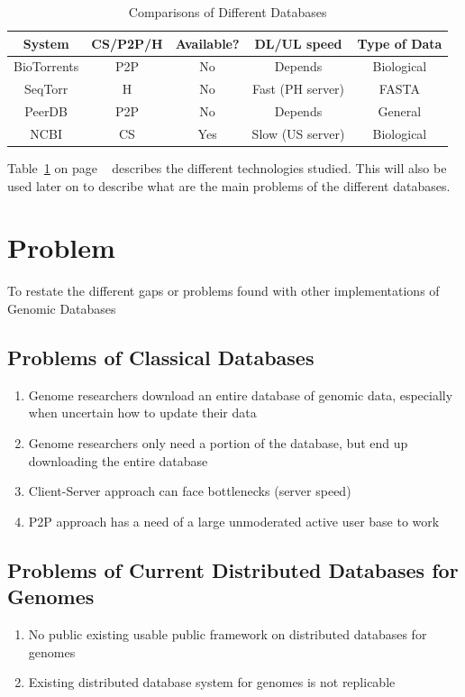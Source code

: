 \documentclass[acmsmall]{acmart}
\begin{document}
\begin{table}[h]
    \caption{Comparisons of Different Databases}
    \label{table:database_comparison_table}
    \begin{tabular}{ccccc}
    \toprule
    System      & CS/P2P/H & Available? & DL/UL speed & Type of Data \\ 
    \midrule
    BioTorrents & P2P           & No         & Depends                    & Biological  \\ 
    SeqTorr     & H             & No         & Fast (PH server)           & FASTA        \\ 
    PeerDB      & P2P           & No         & Depends                    & General      \\ 
    NCBI        & CS            & Yes        & Slow (US server)           & Biological  \\ 
    \bottomrule
    \end{tabular}
\end{table} 

Table~\ref{table:database_comparison_table} on page ~\pageref{table:database_comparison_table} describes the different technologies studied. This will also be used later on to describe what are the main problems of the different databases.

\section{Problem}
To restate the different gaps or problems found with other implementations of Genomic Databases
\subsection{Problems of Classical Databases}
\begin{enumerate}
\item Genome researchers download an entire database of genomic data, especially when uncertain how to update their data
\item Genome researchers only need a portion of the database, but end up downloading the entire database
\item Client-Server approach can face bottlenecks (server speed)
\item P2P approach has a need of a large unmoderated active user base to work

\end{enumerate}

\subsection{Problems of Current Distributed Databases for Genomes}
\begin{enumerate}
    \item No public existing usable public framework on distributed databases for genomes
    \item Existing distributed database system for genomes is not replicable
\end{enumerate}
\end{document}
